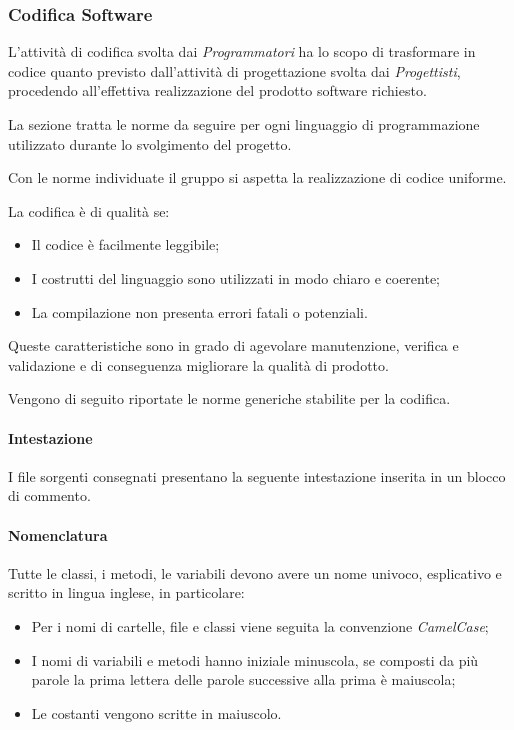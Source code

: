 \subsubsection{Codifica Software}
L'attività di codifica svolta dai \textit{Programmatori} ha lo scopo di trasformare in codice quanto previsto dall'attività di progettazione svolta dai \textit{Progettisti}, procedendo all'effettiva realizzazione del prodotto software richiesto.

La sezione tratta le norme da seguire per ogni linguaggio di programmazione utilizzato durante lo svolgimento del progetto.

Con le norme individuate il gruppo si aspetta la realizzazione di codice uniforme.

La codifica è di qualità se: 
\begin{itemize}
	\item Il codice è facilmente leggibile;
	\item I costrutti del linguaggio sono utilizzati in modo chiaro e coerente;
	\item La compilazione non presenta errori fatali o potenziali.
\end{itemize}
Queste caratteristiche sono in grado di agevolare manutenzione, verifica e validazione e di conseguenza migliorare la qualità di prodotto.

\label{CodificaConvenzioni}
Vengono di seguito riportate le norme generiche stabilite per la codifica.
\paragraph*{Intestazione}
I file sorgenti consegnati presentano la seguente intestazione inserita in un blocco di commento.
\paragraph*{Nomenclatura}
Tutte le classi, i metodi, le variabili devono avere un nome univoco, esplicativo e scritto in lingua inglese, in particolare:
\begin{itemize}
	\item Per i nomi di cartelle, file e classi viene seguita la convenzione \textit{CamelCase};
	\item I nomi di variabili e metodi hanno iniziale minuscola, se composti da più parole la prima lettera delle parole successive alla prima è maiuscola;
	\item Le costanti vengono scritte in maiuscolo.
\end{itemize}
